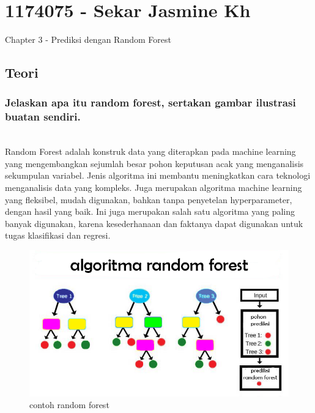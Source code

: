\section{1174075 - Sekar Jasmine Kh}
Chapter 3 - Prediksi dengan Random Forest
\subsection{Teori}
\subsubsection{ Jelaskan apa itu random forest, sertakan gambar ilustrasi buatan sendiri.}
\hfill\\
Random Forest adalah konstruk data yang diterapkan pada machine learning yang mengembangkan sejumlah besar pohon keputusan acak yang menganalisis sekumpulan variabel. Jenis algoritma ini membantu meningkatkan cara teknologi menganalisis data yang kompleks. Juga merupakan algoritma machine learning yang ﬂeksibel, mudah digunakan, bahkan tanpa penyetelan hyperparameter, dengan hasil yang baik. Ini juga merupakan salah satu algoritma yang paling banyak digunakan, karena kesederhanaan dan faktanya dapat digunakan untuk tugas klasiﬁkasi dan regresi.

\begin{figure}[H]
	\centering
	\includegraphics[width=12cm]{figures/1174075/3/1.png}
	\caption{contoh random forest}
\end{figure}


